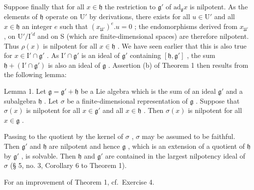 Suppose finally that for all \(x \in \mathfrak{h}\) the restriction to \(\mathfrak{g}'\) of \(\mathrm{ad}_{\mathfrak{g}}x\) is nilpotent. As the elements of \(\mathfrak{h}\) operate on \(\mathrm{U}'\) by derivations, there exists for all \(u \in \mathrm{U}'\) and all \(x \in \mathfrak{h}\) an integer \(e\) such that \((x_{\mathfrak{U}'})^e.u = 0\) ; the endomorphisms derived from \(x_{\mathfrak{U}'}\) , on \(\mathrm{U}' / \mathrm{I}^{\prime d}\) and on S (which are finite-dimensional spaces) are therefore nilpotent. Thus \(\rho(x)\) is nilpotent for all \(x \in \mathfrak{h}\) . We have seen earlier that this is also true for \(x \in \mathrm{I}' \cap \mathfrak{g}'\) . As \(\mathrm{I}' \cap \mathfrak{g}'\) is an ideal of \(\mathfrak{g}'\) containing \([\mathfrak{h}, \mathfrak{g}']\) , the sum \(\mathfrak{h} + (\mathrm{I}' \cap \mathfrak{g}')\) is also an ideal of \(\mathfrak{g}\) . Assertion (b) of Theorem 1 then results from the following lemma:

Lemma 1. Let \(\mathfrak{g} = \mathfrak{g}' + \mathfrak{h}\) be a Lie algebra which is the sum of an ideal \(\mathfrak{g}'\) and a subalgebra \(\mathfrak{h}\) . Let \(\sigma\) be a finite-dimensional representation of \(\mathfrak{g}\) . Suppose that \(\sigma(x)\) is nilpotent for all \(x \in \mathfrak{g}'\) and all \(x \in \mathfrak{h}\) . Then \(\sigma(x)\) is nilpotent for all \(x \in \mathfrak{g}\) .

Passing to the quotient by the kernel of \(\sigma\) , \(\sigma\) may be assumed to be faithful. Then \(\mathfrak{g}'\) and \(\mathfrak{h}\) are nilpotent and hence \(\mathfrak{g}\) , which is an extension of a quotient of \(\mathfrak{h}\) by \(\mathfrak{g}'\) , is solvable. Then \(\mathfrak{h}\) and \(\mathfrak{g}'\) are contained in the largest nilpotency ideal of \(\sigma\) (§ 5, no. 3, Corollary 6 to Theorem 1).

For an improvement of Theorem 1, cf.~Exercise 4.

